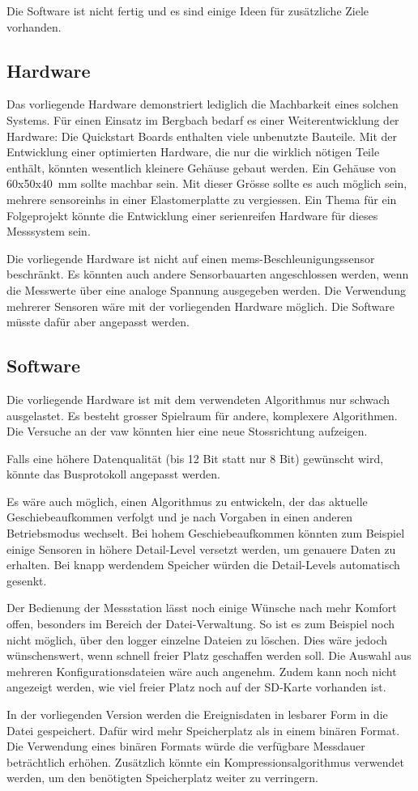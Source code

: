 Die Software ist nicht fertig und es sind einige Ideen für zusätzliche Ziele vorhanden.

\subsection{Hardware}
Das vorliegende Hardware demonstriert lediglich die Machbarkeit eines solchen Systems. Für einen Einsatz im Bergbach bedarf es einer Weiterentwicklung der Hardware: Die Quickstart Boards enthalten viele unbenutzte Bauteile. Mit der Entwicklung einer optimierten Hardware, die nur die wirklich nötigen Teile enthält, könnten wesentlich kleinere Gehäuse gebaut werden. Ein Gehäuse von 60x50x40~mm sollte machbar sein. Mit dieser Grösse sollte es auch möglich sein, mehrere \glspl{sensoreinh} in einer Elastomerplatte zu vergiessen. Ein Thema für ein Folgeprojekt könnte die Entwicklung einer serienreifen Hardware für dieses Messsystem sein.

Die vorliegende Hardware ist nicht auf einen \gls{mems}-Beschleunigungssensor beschränkt. Es könnten auch andere Sensorbauarten angeschlossen werden, wenn die Messwerte über eine analoge Spannung ausgegeben werden. Die Verwendung mehrerer Sensoren wäre mit der vorliegenden Hardware möglich. Die Software müsste dafür aber angepasst werden.

\subsection{Software}
Die vorliegende Hardware ist mit dem verwendeten Algorithmus nur schwach ausgelastet. Es besteht grosser Spielraum für andere, komplexere Algorithmen. Die Versuche an der \gls{vaw} könnten hier eine neue Stossrichtung aufzeigen.

Falls eine höhere Datenqualität (bis 12 Bit statt nur 8 Bit) gewünscht wird, könnte das Busprotokoll angepasst werden.

Es wäre auch möglich, einen Algorithmus zu entwickeln, der das aktuelle Geschiebeaufkommen verfolgt und je nach Vorgaben in einen anderen Betriebsmodus wechselt. Bei hohem Geschiebeaufkommen könnten zum Beispiel einige Sensoren in höhere Detail-Level versetzt werden, um genauere Daten zu erhalten. Bei knapp werdendem Speicher würden die Detail-Levels automatisch gesenkt.

Der Bedienung der Messstation lässt noch einige Wünsche nach mehr Komfort offen, besonders im Bereich der Datei-Verwaltung. So ist es zum Beispiel noch nicht möglich, über den \gls{logger} einzelne Dateien zu löschen. Dies wäre jedoch wünschenswert, wenn schnell freier Platz geschaffen werden soll. Die Auswahl aus mehreren Konfigurationsdateien wäre auch angenehm. Zudem kann noch nicht angezeigt werden, wie viel freier Platz noch auf der SD-Karte vorhanden ist.

In der vorliegenden Version werden die Ereignisdaten in lesbarer Form in die Datei gespeichert. Dafür wird mehr Speicherplatz als in einem binären Format. Die Verwendung eines binären Formats würde die verfügbare Messdauer beträchtlich erhöhen. Zusätzlich könnte ein Kompressionsalgorithmus verwendet werden, um den benötigten Speicherplatz weiter zu verringern.
